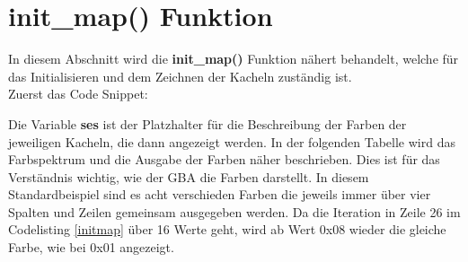 \section{init\_map() Funktion}
In diesem Abschnitt wird die \textbf{init\_map()} Funktion nähert behandelt, welche für das Initialisieren und dem Zeichnen der Kacheln zuständig ist. \citep{tonc} \\
Zuerst das Code Snippet:



Die Variable \textbf{ses} ist der Platzhalter für die Beschreibung der Farben der jeweiligen Kacheln, die dann angezeigt werden. In der folgenden Tabelle wird das Farbspektrum und die Ausgabe der Farben näher beschrieben. Dies ist für das Verständnis wichtig, wie der \acs{GBA} die Farben darstellt. In diesem Standardbeispiel sind es acht verschieden Farben die jeweils immer über vier Spalten und Zeilen gemeinsam ausgegeben werden. Da die Iteration in Zeile 26 im Codelisting \ref{initmap} über 16 Werte geht, wird ab Wert 0x08 wieder die gleiche Farbe, wie bei 0x01 angezeigt.

